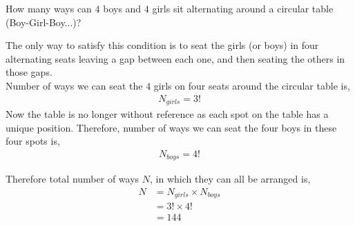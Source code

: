 
%
%
%
%
% 
% 

\question[4] How many ways can $4$ boys and $4$ girls sit alternating around a circular table (Boy-Girl-Boy...)?


\ifprintanswers
\fi 

\begin{solution}[\halfpage]
  The only way to satisfy this condition is to seat the girls (or boys) in four alternating seats leaving a gap between each one, and then seating the others in those gaps. \\
  Number of ways we can seat the $4$ girls on four seats around the circular table is,
  \begin{align}
    N_{girls} = 3!
  \end{align}
  Now the table is no longer without reference as each spot on the table has a unique position. Therefore, number of ways we can seat the four boys in these four spots is,
  \begin{align}
    N_{boys} = 4!
  \end{align}

  Therefore total number of ways $N$, in which they can all be arranged is,
    \begin{align}
      N &= N_{girls} \times N_{boys} \nonumber \\
        &= 3! \times 4! \nonumber \\
        &= 144
    \end{align}

\end{solution}

